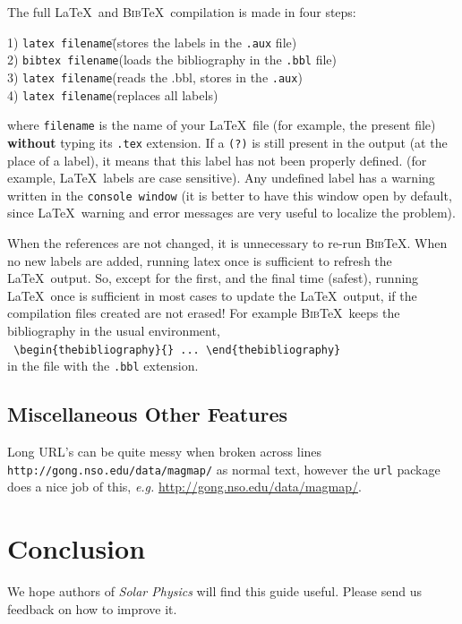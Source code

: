 \documentclass[namedreferences]{SolarPhysics}
\newcommand{\BibTeX}{\textsc{Bib}\TeX}
\begin{document}
\begin{article}
   The full \LaTeX\ and \BibTeX\ compilation is made in four steps: 
\begin{tabbing}
1) {\tt latex filename}\qquad\qquad\=(stores the labels in the {\tt .aux} file)\\
2) {\tt bibtex filename}\>(loads the bibliography in the {\tt .bbl} file)\\
3) {\tt latex filename}\>(reads the .bbl, stores in the {\tt .aux})\\
4) {\tt latex filename}\>(replaces all labels)  
\end{tabbing}
   where \texttt{filename} is the name of your \LaTeX\ file (for example, 
the present file) {\bf without} typing its \texttt{.tex} extension.
If a \texttt{(?)} is still present in the output (at the place of a label),
it means that this label has not been properly defined. 
 (for example, \LaTeX\ labels are case sensitive).
Any undefined label has a warning written in the \texttt{console window}
(it is better to have this window open by default, since \LaTeX\ warning and 
error messages are very useful to localize the problem).

  When the references are not changed, it is unnecessary to re-run \BibTeX .
When no new labels are added, running latex once is sufficient to refresh
the \LaTeX\ output. So, except for
the first, and the final time (safest), running \LaTeX\ once is sufficient
in most cases to update the \LaTeX\ output, if the compilation files 
created are not erased! For example \BibTeX\ keeps the bibliography in the usual 
environment,\\
  \verb+ \begin{thebibliography}{} ... \end{thebibliography}+\\
in the file with the \verb+.bbl+ extension.  

\subsection{Miscellaneous Other Features} %
      \label{S-Miscellaneous} 
Long URL's can be quite messy when broken across lines
\texttt{ http://gong.nso.edu/data/magmap/} as normal text,
however the \texttt{url} package does a nice job of this, \textit{e.g.} 
\url{http://gong.nso.edu/data/magmap/}.
   
\section{Conclusion} %
      \label{S-Conclusion} 
      We hope authors of {\it Solar Physics} will find this guide useful.
Please send us feedback on how to improve it.
      

\end{article}
\end{document}
